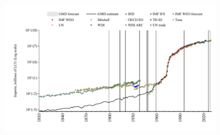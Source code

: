 \documentclass[12pt,a4paper,landscape]{article}
\begin{document}
\begin{adjustbox}{max totalsize={\paperwidth}{\paperheight},center}
\begin{minipage}[t][\textheight][t]{\textwidth}
\begin{figure}[H]
\includegraphics[width=\textwidth,height=0.6\textheight,keepaspectratio]{graphs/CHL_imports.pdf}
\end{figure}
\end{minipage}
\end{adjustbox}
\end{document}
